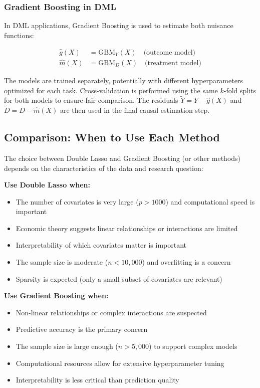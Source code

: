 \documentclass[12pt,a4paper]{article}
\begin{document}
\subsubsection{Gradient Boosting in DML}

In DML applications, Gradient Boosting is used to estimate both nuisance functions:

\begin{align}
\hat{g}(X) &= \text{GBM}_Y(X) \quad \text{(outcome model)} \\
\hat{m}(X) &= \text{GBM}_D(X) \quad \text{(treatment model)}
\end{align}

The models are trained separately, potentially with different hyperparameters optimized for each task. Cross-validation is performed using the same $k$-fold splits for both models to ensure fair comparison. The residuals $\tilde{Y} = Y - \hat{g}(X)$ and $\tilde{D} = D - \hat{m}(X)$ are then used in the final causal estimation step.

\subsection{Comparison: When to Use Each Method}

The choice between Double Lasso and Gradient Boosting (or other methods) depends on the characteristics of the data and research question:

\textbf{Use Double Lasso when:}
\begin{itemize}
\item The number of covariates is very large ($p > 1000$) and computational speed is important
\item Economic theory suggests linear relationships or interactions are limited
\item Interpretability of which covariates matter is important
\item The sample size is moderate ($n < 10,000$) and overfitting is a concern
\item Sparsity is expected (only a small subset of covariates are relevant)
\end{itemize}

\textbf{Use Gradient Boosting when:}
\begin{itemize}
\item Non-linear relationships or complex interactions are suspected
\item Predictive accuracy is the primary concern
\item The sample size is large enough ($n > 5,000$) to support complex models
\item Computational resources allow for extensive hyperparameter tuning
\item Interpretability is less critical than prediction quality
\end{itemize}
\end{document}
